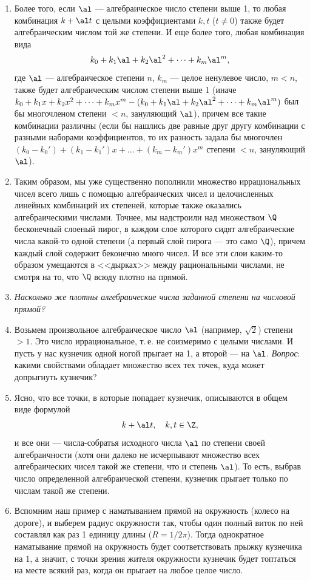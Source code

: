 \begin{enumerate}
\item Более того, если $\al$ --- алгебраическое число степени выше 1, то любая комбинация $k+\al t$ с целыми коэффициентами $k,t$ ($t\ne 0$) также будет алгебраическим числом той же степени. И еще более того, любая комбинация вида
$$
k_0+k_1\al+k_2\al^2+\dots+k_m\al^m,
$$
где $\al$ --- алгебраическое степени $n$, $k_m$ --- целое ненулевое число, $m<n$, также будет алгебраическим числом степени выше 1 (иначе $k_0+k_1x+k_2x^2+\dots+k_mx^m-(k_0+k_1\al+k_2\al^2+\dots+k_m\al^m)$ был бы многочленом степени $<n$, зануляющий $\al$), причем все такие комбинации различны (если бы нашлись две равные друг другу комбинации с разными наборами коэффициентов, то их разность задала бы многочлен $(k_0-k_0')+(k_1-k_1')x+\dots+(k_m-k_m')x^m$ степени $<n$, зануляющий $\al$).
\item Таким образом, мы уже существенно пополнили множество иррациональных чисел всего лишь с помощью алгебраических чисел и целочисленных линейных комбинаций их степеней, которые также оказались алгебраическими числами. Точнее, мы надстроили над множеством $\Q$ бесконечный слоеный пирог, в каждом слое которого сидят алгебраические числа какой-то одной степени (а первый слой пирога --- это само $\Q$), причем каждый слой содержит беконечно много чисел. И все эти слои каким-то образом умещаются в <<дырках>> между рациональными числами, не смотря на то, что $\Q$ всюду плотно на прямой.
\item \textit{Насколько же плотны алгебраические числа заданной степени на числовой прямой?}
\item Возьмем произвольное алгебраическое число $\al$ (например, $\sqrt 2$) степени $>1$. Это число иррациональное, т.\,е. не соизмеримо с целыми числами. И пусть у нас кузнечик одной ногой прыгает на 1, а второй --- на $\al$. \textit{Вопрос}: какими свойствами обладает множество всех тех точек, куда может допрыгнуть кузнечик?
\item Ясно, что все точки, в которые попадает кузнечик, описываются в общем виде формулой
$$
k + \al t,\quad k,t\in\Z,
$$
и все они --- числа-собратья исходного числа $\al$ по степени своей алгебраичности (хотя они далеко не исчерпывают множество всех алгебраических чисел такой же степени, что и степень $\al$). То есть, выбрав число определенной алгебраической степени, кузнечик прыгает только по числам такой же степени.
\item Вспомним наш пример с наматыванием прямой на окружность (колесо на дороге), и выберем радиус окружности так, чтобы один полный виток по ней составлял как раз 1 единицу длины ($R=1/2\pi$). Тогда однократное наматывание прямой на окружность будет соответствовать прыжку кузнечика на 1, а значит, с точки зрения жителя окружности кузнечик будет топтаться на месте всякий раз, когда он прыгает на любое целое число.

\end{enumerate}
